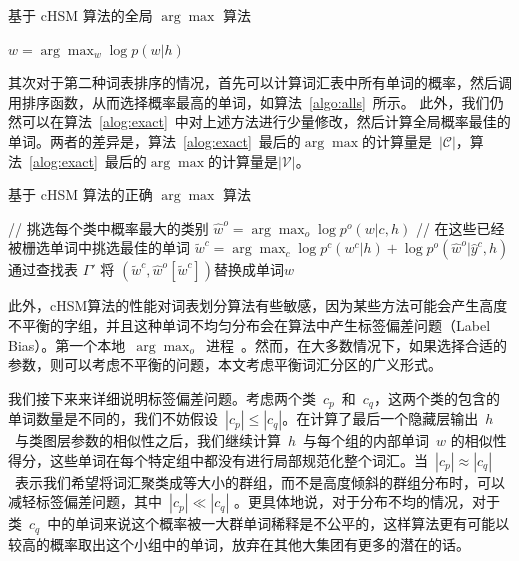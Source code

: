 \begin{algorithm}[!ht]
\caption{基于 cHSM 算法的全局 $\arg\max$ 算法}\label{algo:alls}
 {$w=\arg\max_w \log p(w|h)$}\;
\end{algorithm}

其次对于第二种词表排序的情况，首先可以计算词汇表中所有单词的概率，然后调用排序函数，从而选择概率最高的单词，如算法~\ref{algo:alls}~所示。 此外，我们仍然可以在算法~\ref{alog:exact}~中对上述方法进行少量修改，然后计算全局概率最佳的单词。两者的差异是，算法~\ref{alog:exact}~最后的$\arg\max$的计算量是~$\mathcal{|C|}$，算法~\ref{alog:exact}~最后的$\arg\max$的计算量是$\mathcal{|V|}$。
\begin{algorithm}[!t]
\caption{基于 cHSM 算法的正确 $\arg\max$ 算法}\label{alog:exact}
{// 挑选每个类中概率最大的类别}\;
 {$\hat w^o=\arg\max_o{\log p^o(w| c,h)}$ }\;
 {// 在这些已经被栅选单词中挑选最佳的单词}
 {$\tilde w^c=\arg\max_c{\log p^c(w^c|h)+\log p^o(\hat w^o|\hat y^c,h)}$}\;
通过查找表 $\Gamma'$ 将 $(\tilde w^c,\hat w^o[\tilde w^c])$替换成单词$w$ \;
\end{algorithm}


此外，cHSM算法的性能对词表划分算法有些敏感，因为某些方法可能会产生高度不平衡的字组，并且这种单词不均匀分布会在算法中产生标签偏差问题（Label Bias）。第一个本地~$\arg\max_o$~进程~。然而，在大多数情况下，如果选择合适的参数，则可以考虑不平衡的问题，本文考虑平衡词汇分区的广义形式。

我们接下来来详细说明标签偏差问题。考虑两个类~$c_p$~和~$c_q$，这两个类的包含的单词数量是不同的，我们不妨假设~$|c_p|\le|c_q|$。在计算了最后一个隐藏层输出~$h$~与类图层参数的相似性之后，我们继续计算~$h$~与每个组的内部单词~$w$ 的相似性得分，这些单词在每个特定组中都没有进行局部规范化整个词汇。当~$|c_p|\approx|c_q|$~表示我们希望将词汇聚类成等大小的群组，而不是高度倾斜的群组分布时，可以减轻标签偏差问题，其中~$|c_p|\ll|c_q|$ 。更具体地说，对于分布不均的情况，对于类~$c_q$~中的单词来说这个概率被一大群单词稀释是不公平的，这样算法更有可能以较高的概率取出这个小组中的单词，放弃在其他大集团有更多的潜在的话。

